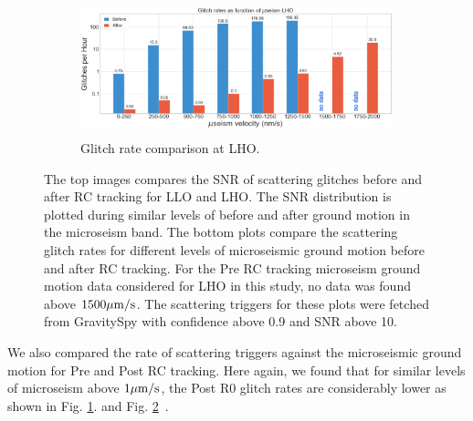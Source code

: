 \documentclass[12pt]{iopart}
\begin{document}
\begin{figure}[h]
\begin{subfigure}[b]{0.45\textwidth}
         \label{fig:rate_LLO}
    \end{subfigure}
    \hfill
    \begin{subfigure}[b]{0.45\textwidth}
        \centering
         \includegraphics[width =\textwidth,height=3.9cm]{glitch_rateLHO.png}
         \caption{Glitch rate comparison at LHO.}
         \label{fig:rate_LHO}
    \end{subfigure}
    
    
    
    \caption{The top images compares the SNR of scattering glitches before and after RC tracking for LLO and LHO. The  SNR distribution is plotted during similar levels of before and after ground motion in the microseism band. The bottom plots compare the scattering glitch rates for different levels of microseismic ground motion before and after RC tracking. For the Pre RC tracking microseism ground motion data considered for LHO in this study, no data was found above $1500\mu{\rm m/s}$. The scattering triggers for these plots were fetched from GravitySpy with confidence above 0.9 and SNR above 10.} %
    \label{fig:postr0_scat}
    
\end{figure}
We also compared the rate of scattering triggers against the microseismic ground motion for Pre and Post RC tracking. Here again, we found that for similar levels of microseism above $1\mu{\rm m/s}$, the Post R0 glitch rates are considerably lower as shown in Fig. \ref{fig:rate_LLO}. and Fig. \ref{fig:rate_LHO}~\cite{alog_corey}.
\end{document}
